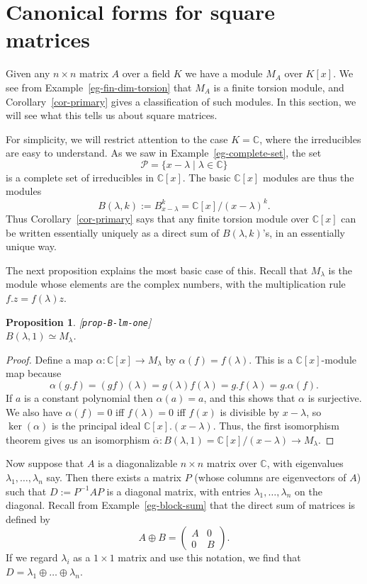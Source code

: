 \documentclass{amsart}
\newcommand{\lbl}[1]{\label{#1}\textup{[\texttt{#1}]}\ \\}
\newcommand{\lbl}{\label}
\newcommand{\C}         {{\mathbb{C}}}
\newcommand{\al}        {\alpha}
\newcommand{\alb}       {\overline{\alpha}}
\newcommand{\lm}        {\lambda}
\newcommand{\tm}        {\times}
\newcommand{\xra}       {\xrightarrow}
\newcommand{\st}        {\;|\;}
\newcommand{\op}        {\oplus}
\newcommand{\CP}        {{\mathcal{P}}}
\newcommand{\blockmat}[4]{
 \left(\begin{array}{c|c} #1&#2 \\ \hline #3&#4\end{array}\right)}
\renewcommand{\:}{\colon}
\newtheorem{proposition}[theorem]{Proposition}
\theoremstyle{definition}
\begin{document}
\section{Canonical forms for square matrices }
\label{sec-jordan}

Given any $n\tm n$ matrix $A$ over a field $K$ we have a module $M_A$
over $K[x]$.  We see from Example~\ref{eg-fin-dim-torsion} that $M_A$
is a finite torsion module, and Corollary~\ref{cor-primary} gives a
classification of such modules.  In this section, we will see what
this tells us about square matrices. 

For simplicity, we will restrict attention to the case $K=\C$, where
the irreducibles are easy to understand.  As we saw in
Example~\ref{eg-complete-set}, the set
\[ \CP = \{x-\lm\st \lm\in\C\} \]
is a complete set of irreducibles in $\C[x]$.  The basic $\C[x]$
modules are thus the modules
\[ B(\lm,k) := B_{x-\lm}^k = \C[x]/(x-\lm)^k. \]
Thus Corollary~\ref{cor-primary} says that any finite torsion module
over $\C[x]$ can be written essentially uniquely as a direct sum of
$B(\lm,k)$'s, in an essentially unique way.  

The next proposition explains the most basic case of this.  Recall
that $M_\lm$ is the module whose elements are the complex numbers,
with the multiplication rule $f.z=f(\lm)z$.
\begin{proposition}\lbl{prop-B-lm-one}
 $B(\lm,1)\simeq M_\lm$.
\end{proposition}
\begin{proof}
 Define a map $\al\:\C[x]\xra{}M_\lm$ by $\al(f)=f(\lm)$.  This is a
 $\C[x]$-module map because 
 \[ \al(g.f)=(gf)(\lm)=g(\lm)f(\lm)=g.f(\lm)=g.\al(f). \]
 If $a$ is a constant polynomial then $\al(a)=a$, and this shows that
 $\al$ is surjective.  We also have $\al(f)=0$ iff $f(\lm)=0$ iff
 $f(x)$ is divisible by $x-\lm$, so $\ker(\al)$ is the principal ideal
 $\C[x].(x-\lm)$.  Thus, the first isomorphism theorem gives us an
 isomorphism $\alb\:B(\lm,1)=\C[x]/(x-\lm)\xra{}M_\lm$.
\end{proof}

Now suppose that $A$ is a diagonalizable $n\tm n$ matrix over $\C$,
with eigenvalues $\lm_1,\ldots,\lm_n$ say.  Then there exists a matrix
$P$ (whose columns are eigenvectors of $A$) such that $D:=P^{-1}AP$ is
a diagonal matrix, with entries $\lm_1,\ldots,\lm_n$ on the diagonal.
Recall from Example~\ref{eg-block-sum} that the direct sum of matrices
is defined by 
\[ A\op B=\blockmat{A}{0}{0}{B}.\]
If we regard $\lm_i$ as a $1\tm 1$ matrix and use this notation, we
find that $D=\lm_1\op\ldots\op\lm_n$.
\end{document}
